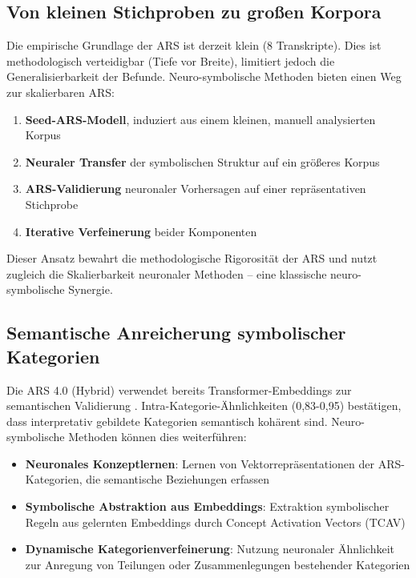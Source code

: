 \documentclass[12pt,a4paper]{article}
\begin{document}
\subsection{Von kleinen Stichproben zu großen Korpora}

Die empirische Grundlage der ARS ist derzeit klein (8 Transkripte). Dies ist 
methodologisch verteidigbar (Tiefe vor Breite), limitiert jedoch die Generalisierbarkeit 
der Befunde. Neuro-symbolische Methoden bieten einen Weg zur skalierbaren ARS:

\begin{enumerate}
    \item \textbf{Seed-ARS-Modell}, induziert aus einem kleinen, manuell analysierten Korpus
    \item \textbf{Neuraler Transfer} der symbolischen Struktur auf ein größeres Korpus
    \item \textbf{ARS-Validierung} neuronaler Vorhersagen auf einer repräsentativen Stichprobe
    \item \textbf{Iterative Verfeinerung} beider Komponenten
\end{enumerate}

Dieser Ansatz bewahrt die methodologische Rigorosität der ARS und nutzt zugleich 
die Skalierbarkeit neuronaler Methoden – eine klassische neuro-symbolische Synergie.

\subsection{Semantische Anreicherung symbolischer Kategorien}

Die ARS 4.0 (Hybrid) verwendet bereits Transformer-Embeddings zur semantischen 
Validierung \citep{koop2024hybrid}. Intra-Kategorie-Ähnlichkeiten (0,83-0,95) 
bestätigen, dass interpretativ gebildete Kategorien semantisch kohärent sind. 
Neuro-symbolische Methoden können dies weiterführen:

\begin{itemize}
    \item \textbf{Neuronales Konzeptlernen}: Lernen von Vektorrepräsentationen 
    der ARS-Kategorien, die semantische Beziehungen erfassen
    \item \textbf{Symbolische Abstraktion aus Embeddings}: Extraktion symbolischer 
    Regeln aus gelernten Embeddings durch Concept Activation Vectors (TCAV)
    \item \textbf{Dynamische Kategorienverfeinerung}: Nutzung neuronaler Ähnlichkeit 
    zur Anregung von Teilungen oder Zusammenlegungen bestehender Kategorien
\end{itemize}
\end{document}

